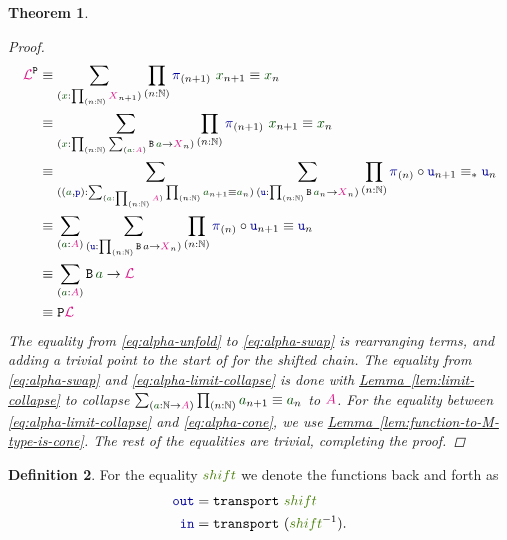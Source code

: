 \documentclass[twoside,11pt,openright]{report}
\theoremstyle{plain} %
\newtheorem{thm}{Theorem}[section]
\theoremstyle{definition}
\newtheorem{defn}[thm]{Definition}%
\theoremstyle{remark}
\newcommand*{\lemref}[1]{\hyperref[lem:#1]{Lemma~\ref*{lem:#1}}}
\newcommand*{\term}[1]{\textcolor{green!30!black}{#1}} %
\newcommand*{\pathterm}[1]{\textcolor{green!65!red!75!black}{#1}}
\newcommand*{\type}[1]{\textcolor{magenta!90!black}{#1}}
\newcommand*{\function}[1]{\textcolor{blue!60!black}{\ensuremath{\mathtt{#1}}}}
\newcommand*{\typeformer}[1]{\ensuremath{\mathtt{#1}}}
\newcommand*{\functor}[1]{\ensuremath{\mathbf{\mathtt{#1}}}}
\newcommand*{\sym}[1]{\ensuremath{#1^{-1}}}
\begin{document}
\begin{thm}
\begin{proof}
    \begin{align}
      \type{\mathcal{L}}^{\functor{P}} &\equiv \sum_{(\term{x} : \prod_{(n : \mathbb{N})} \type{X}_{n+1})} \prod_{(n : \mathbb{N})} \function{\pi}_{(n+1)}~\term{x}_{n+1} \equiv \term{x}_{n} \\
      &\equiv \sum_{(\term{x} : \prod_{(n : \mathbb{N})} \sum_{(\term{a} : \type{A})} \typeformer{B}\,\term{a} \rightarrow \type{X}_n)} \prod_{(n : \mathbb{N})} \function{\pi}_{(n+1)}~\term{x}_{n+1} \equiv \term{x}_{n} \label{eq:alpha-unfold}\\
      &\equiv \sum_{((\term{a} , \function{p}) : \sum_{(\term{a} : \prod_{(n : \mathbb{N})} \type{A})} \prod_{(n : \mathbb{N})} \term{a}_{n+1} \equiv \term{a}_n)} \sum_{(\function{u} : \prod_{(n : \mathbb{N})} \typeformer{B}\,\term{a}_n \rightarrow \type{X}_n)} \prod_{(n : \mathbb{N})} \function{\pi}_{(n)} \circ \function{u}_{n+1} \equiv_* \function{u}_n \label{eq:alpha-swap} \\
      &\equiv \sum_{(\term{a} : \type{A})} \sum_{(\function{u} : \prod_{(n : \mathbb{N})} \typeformer{B}\,a \rightarrow \type{X}_n)} \prod_{(n : \mathbb{N})} \function{\pi}_{(n)} \circ \function{u}_{n+1} \equiv \function{u}_n \label{eq:alpha-limit-collapse} \\
      &\equiv \sum_{(\term{a} : \type{A})} \typeformer{B}\,\term{a} \rightarrow \type{\mathcal{L}} \label{eq:alpha-cone}\\
      &\equiv \functor{P}\type{\mathcal{L}}
    \end{align}
    The equality from \eqref{eq:alpha-unfold} to \eqref{eq:alpha-swap} is rearranging terms, and adding a trivial point to the start of for the shifted chain. The equality from \eqref{eq:alpha-swap} and \eqref{eq:alpha-limit-collapse} is done with \lemref{limit-collapse} to collapse \(\sum_{(\term{a} : \mathbb{N} \rightarrow \type{A})} \prod_{(n : \mathbb{N})} \term{a}_{n+1} \equiv \term{a}_n\) to \(\type{A}\). For the equality between \eqref{eq:alpha-limit-collapse} and \eqref{eq:alpha-cone}, we use \lemref{function-to-M-type-is-cone}. The rest of the equalities are trivial, completing the proof.
  \end{proof}
\end{thm}
\begin{defn}
  For the equality \(\pathterm{shift}\) we denote the functions back and forth as
  \begin{align}
    \function{out} &= \mathtt{transport}~\pathterm{shift} \\
    \function{in} &= \mathtt{transport}~(\sym{\pathterm{shift}}).
  \end{align}
\end{defn}
\end{document}
